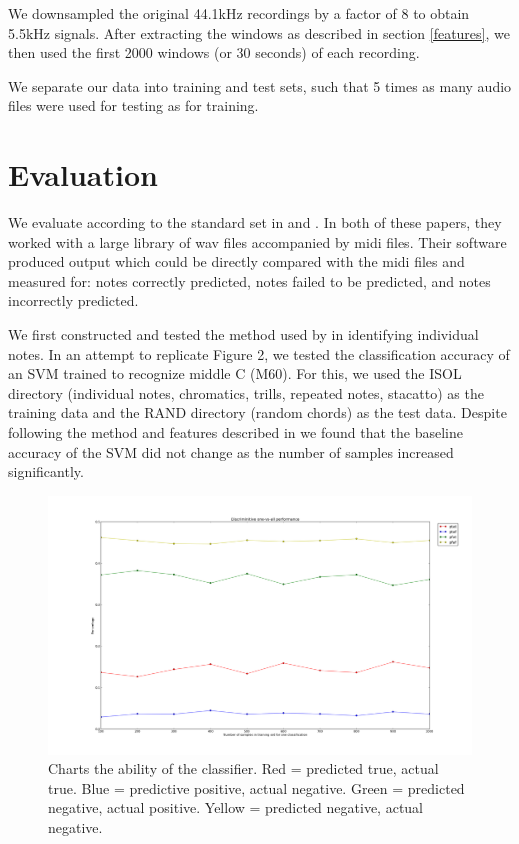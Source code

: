 \documentclass{article}
\begin{document}
We downsampled the original 44.1kHz recordings by a factor of 8 to
obtain 5.5kHz signals. After extracting the windows as described in section
\ref{features}, we then used the first 2000 windows (or 30 seconds) of each
recording.

We separate our data into training and test sets, such that 5 times as
many audio files were used for testing as for training.%

\section{Evaluation}
We evaluate according to the standard set in \cite{poliner2006discriminative} and \cite{bock2012polyphonic}.
In both of these papers, they worked with a large library of wav files accompanied by midi files. Their software produced
output which could be directly compared with the midi files and measured for: notes correctly predicted, notes failed to be predicted, and notes incorrectly predicted.

We first constructed and tested the method used by \cite{poliner2006discriminative} in identifying individual notes. In an attempt to replicate Figure 2, we tested the classification accuracy of an SVM trained to recognize middle C (M60). For this, we used the ISOL directory (individual notes, chromatics, trills, repeated notes, stacatto) as the training data and the RAND directory (random chords) as the test data. Despite following the method and features described in \cite{poliner2006discriminative} we found that the baseline accuracy of the SVM did not change as the number of samples increased significantly.

\begin{figure}
\includegraphics[scale=.15]{discriminitive.png}
\caption{Charts the ability of the classifier. Red = predicted true, actual true. Blue = predictive positive, actual negative. Green = predicted negative, actual positive. Yellow = predicted negative, actual negative.} 
\end{figure}
\end{document}
